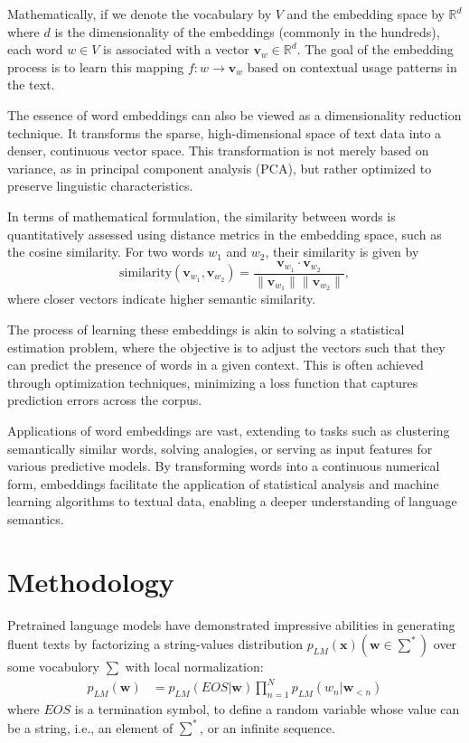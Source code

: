 \documentclass{article}
\begin{document}
Mathematically, if we denote the vocabulary by \(V\) and the embedding space by \(\mathbb{R}^d\) where \(d\) is the dimensionality of the embeddings (commonly in the hundreds), each word \(w \in V\) is associated with a vector \(\mathbf{v}_w \in \mathbb{R}^d\). The goal of the embedding process is to learn this mapping \(f: w \rightarrow \mathbf{v}_w\) based on contextual usage patterns in the text.

The essence of word embeddings can also be viewed as a dimensionality reduction technique. It transforms the sparse, high-dimensional space of text data into a denser, continuous vector space. This transformation is not merely based on variance, as in principal component analysis (PCA), but rather optimized to preserve linguistic characteristics.

In terms of mathematical formulation, the similarity between words is quantitatively assessed using distance metrics in the embedding space, such as the cosine similarity. For two words \(w_1\) and \(w_2\), their similarity is given by $$ \text{similarity}(\mathbf{v}_{w_1}, \mathbf{v}_{w_2}) = \frac{\mathbf{v}_{w_1} \cdot \mathbf{v}_{w_2}}{\|\mathbf{v}_{w_1}\| \|\mathbf{v}_{w_2}\|}, $$ where closer vectors indicate higher semantic similarity.

The process of learning these embeddings is akin to solving a statistical estimation problem, where the objective is to adjust the vectors such that they can predict the presence of words in a given context. This is often achieved through optimization techniques, minimizing a loss function that captures prediction errors across the corpus.

Applications of word embeddings are vast, extending to tasks such as clustering semantically similar words, solving analogies, or serving as input features for various predictive models. By transforming words into a continuous numerical form, embeddings facilitate the application of statistical analysis and machine learning algorithms to textual data, enabling a deeper understanding of language semantics.



\section{Methodology} \cite[]{du2023principled}
Pretrained language models have demonstrated impressive abilities in generating fluent texts by factorizing a string-values distribution $p_{LM}(\boldsymbol{x}) (\boldsymbol{w} \in \sum^*)$ over some vocabulory $\sum$ with local normalization:
\begin{align}
    p_{LM}(\boldsymbol{w}) & = p_{LM}(EOS | \boldsymbol{w}) \prod_{n=1}^{N} p_{LM}(w_n | \boldsymbol{w}_{<n}) \label{eq:1}
\end{align}
where $EOS$ is a termination symbol, to define a
random variable whose value can be a string, i.e.,
an element of $\sum^*$, or an infinite sequence.
\end{document}
